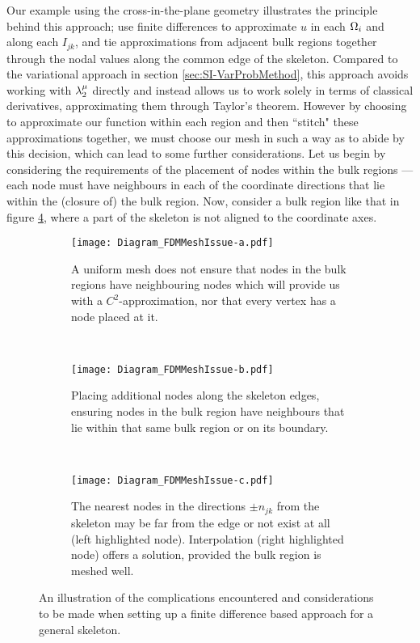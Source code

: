 Our example using the cross-in-the-plane geometry illustrates the principle behind this approach; use finite differences to approximate $u$ in each $\Omega_i$ and along each $I_{jk}$, and tie approximations from adjacent bulk regions together through the nodal values along the common edge of the skeleton.
Compared to the variational approach in section \ref{sec:SI-VarProbMethod}, this approach avoids working with $\lambda_2^{\mu}$ directly and instead allows us to work solely in terms of classical derivatives, approximating them through Taylor's theorem.
However by choosing to approximate our function within each region and then ``stitch" these approximations together, we must choose our mesh in such a way as to abide by this decision, which can lead to some further considerations.
Let us begin by considering the requirements of the placement of nodes within the bulk regions --- each node must have neighbours in each of the coordinate directions that lie within the (closure of) the bulk region.
Now, consider a bulk region like that in figure \ref{fig:Diagram_FDMMeshIssue}, where a part of the skeleton is not aligned to the coordinate axes.
\begin{figure}[t]
	\centering
	\begin{subfigure}[t]{0.3\textwidth}
		\centering
		\texttt{[image: Diagram\_FDMMeshIssue-a.pdf]}
		\caption{\label{fig:Diagram_FDMMeshIssue-a} A uniform mesh does not ensure that nodes in the bulk regions have neighbouring nodes which will provide us with a $C^2$-approximation, nor that every vertex has a node placed at it.}
	\end{subfigure}
	~
	\begin{subfigure}[t]{0.3\textwidth}
		\centering
		\texttt{[image: Diagram\_FDMMeshIssue-b.pdf]}
		\caption{\label{fig:Diagram_FDMMeshIssue-b} Placing additional nodes along the skeleton edges, ensuring nodes in the bulk region have neighbours that lie within that same bulk region or on its boundary.}
	\end{subfigure}
	~
	\begin{subfigure}[t]{0.3\textwidth}
		\centering
		\texttt{[image: Diagram\_FDMMeshIssue-c.pdf]}
		\caption{\label{fig:Diagram_FDMMeshIssue-c} The nearest nodes in the directions $\pm n_{jk}$ from the skeleton may be far from the edge or not exist at all (left highlighted node). Interpolation (right highlighted node) offers a solution, provided the bulk region is meshed well.}
	\end{subfigure}
	\caption{\label{fig:Diagram_FDMMeshIssue} An illustration of the complications encountered and considerations to be made when setting up a finite difference based approach for a general skeleton.}
\end{figure}
